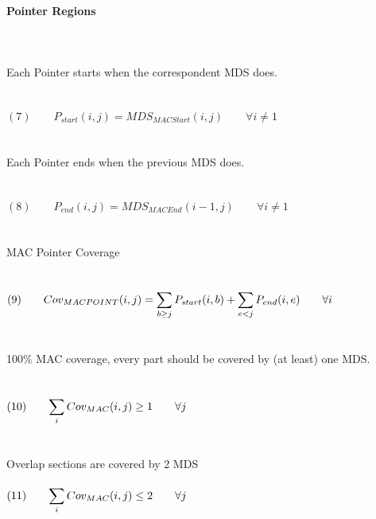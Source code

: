 \paragraph{Pointer Regions} $ $
\\\\\\
Each Pointer starts when the correspondent MDS does. \\\\\\
$(7) \qquad P_{start}(i,j) = MDS_{MACStart}(i,j) \qquad \forall i \neq 1$ \\\\\\
Each Pointer ends when the previous MDS does. \\\\\\
$(8) \qquad P_{end}(i,j) = MDS_{MACEnd}(i-1,j) \qquad \forall i \neq 1$ \\\\\\
MAC Pointer Coverage \\\\\\
$(9) \qquad Cov_{MACPOINT}(i,j) = \mathlarger{\sum_{b \geq j} P_{start}(i,b) + \sum_{e < j} P_{end}(i,e) \qquad \forall i}$ \\\\\\
100\% MAC coverage, every part should be covered by (at least) one MDS. \\\\\\
$(10) \qquad \mathlarger{\sum_{i} Cov_{MAC}(i,j) \geq 1 \qquad \forall j }$ \\\\\\
\clearpage
Overlap sections are covered by 2 MDS \\\\
$(11) \qquad \mathlarger{\sum_{i} Cov_{MAC}(i,j) \leq 2 \qquad \forall j }$ \\\\\\

